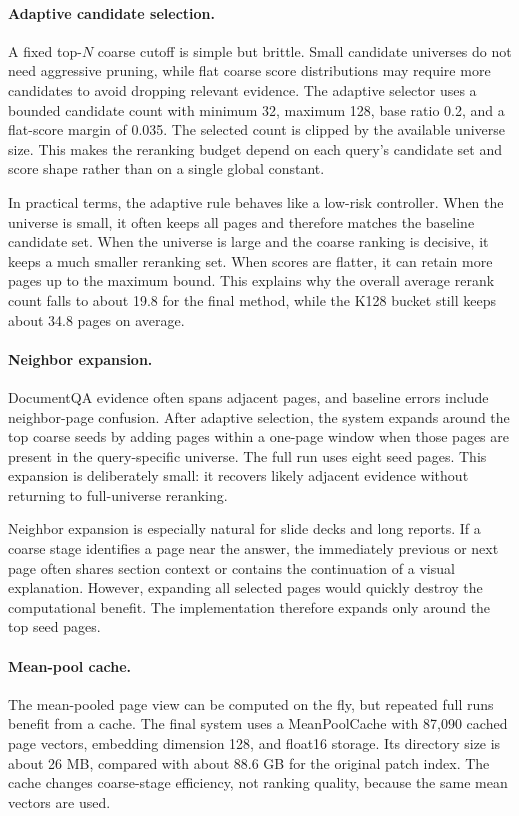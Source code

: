 \documentclass[11pt]{article}
\begin{document}
\paragraph{Adaptive candidate selection.}
A fixed top-$N$ coarse cutoff is simple but brittle. Small candidate universes do not need aggressive pruning, while flat coarse score distributions may require more candidates to avoid dropping relevant evidence. The adaptive selector uses a bounded candidate count with minimum 32, maximum 128, base ratio 0.2, and a flat-score margin of 0.035. The selected count is clipped by the available universe size. This makes the reranking budget depend on each query's candidate set and score shape rather than on a single global constant.

In practical terms, the adaptive rule behaves like a low-risk controller. When the universe is small, it often keeps all pages and therefore matches the baseline candidate set. When the universe is large and the coarse ranking is decisive, it keeps a much smaller reranking set. When scores are flatter, it can retain more pages up to the maximum bound. This explains why the overall average rerank count falls to about 19.8 for the final method, while the K128 bucket still keeps about 34.8 pages on average.

\paragraph{Neighbor expansion.}
DocumentQA evidence often spans adjacent pages, and baseline errors include neighbor-page confusion. After adaptive selection, the system expands around the top coarse seeds by adding pages within a one-page window when those pages are present in the query-specific universe. The full run uses eight seed pages. This expansion is deliberately small: it recovers likely adjacent evidence without returning to full-universe reranking.

Neighbor expansion is especially natural for slide decks and long reports. If a coarse stage identifies a page near the answer, the immediately previous or next page often shares section context or contains the continuation of a visual explanation. However, expanding all selected pages would quickly destroy the computational benefit. The implementation therefore expands only around the top seed pages.

\paragraph{Mean-pool cache.}
The mean-pooled page view can be computed on the fly, but repeated full runs benefit from a cache. The final system uses a MeanPoolCache with 87,090 cached page vectors, embedding dimension 128, and float16 storage. Its directory size is about 26 MB, compared with about 88.6 GB for the original patch index. The cache changes coarse-stage efficiency, not ranking quality, because the same mean vectors are used.
\end{document}
